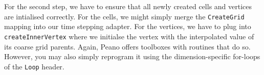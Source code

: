 For the second step, we have to ensure that all newly created cells and vertices
are intialised correctly.
For the cells, we might simply merge the \texttt{CreateGrid} mapping into our
time stepping adapter.
For the vertices, we have to plug into \texttt{createInnerVertex} where we
initialse the vertex with the interpolated value of its coarse grid parents.
Again, Peano offers toolboxes with routines that do so. 
However, you may also simply reprogram it using the dimension-specific for-loops
of the \texttt{Loop} header.

 